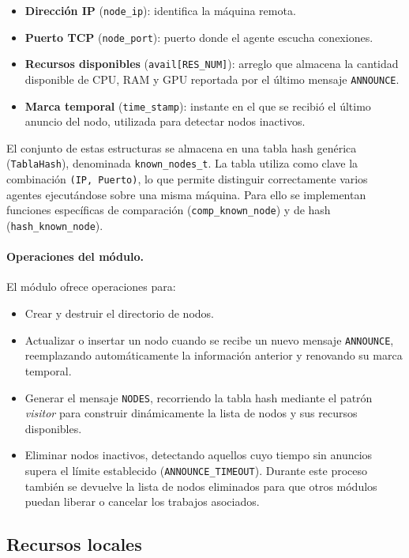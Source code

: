 \documentclass[12pt,a4paper]{article}
\begin{document}
\begin{itemize}
    \item \textbf{Dirección IP} (\texttt{node\_ip}): identifica la máquina remota.
    \item \textbf{Puerto TCP} (\texttt{node\_port}): puerto donde el agente escucha conexiones.
    \item \textbf{Recursos disponibles} (\texttt{avail[RES\_NUM]}): arreglo que almacena la cantidad disponible de CPU, RAM y GPU reportada por el último mensaje \texttt{ANNOUNCE}.
    \item \textbf{Marca temporal} (\texttt{time\_stamp}): instante en el que se recibió el último anuncio del nodo, utilizada para detectar nodos inactivos.
\end{itemize}
 
El conjunto de estas estructuras se almacena en una tabla hash genérica (\texttt{TablaHash}), denominada \texttt{known\_nodes\_t}. La tabla utiliza como clave la combinación \texttt{(IP, Puerto)}, lo que permite distinguir correctamente varios agentes ejecutándose sobre una misma máquina. Para ello se implementan funciones específicas de comparación (\texttt{comp\_known\_node}) y de hash (\texttt{hash\_known\_node}).
 
\paragraph{Operaciones del módulo.}
El módulo ofrece operaciones para:
 
\begin{itemize}
    \item Crear y destruir el directorio de nodos.
    \item Actualizar o insertar un nodo cuando se recibe un nuevo mensaje \texttt{ANNOUNCE}, reemplazando automáticamente la información anterior y renovando su marca temporal.
    \item Generar el mensaje \texttt{NODES}, recorriendo la tabla hash mediante el patrón \emph{visitor} para construir dinámicamente la lista de nodos y sus recursos disponibles.
    \item Eliminar nodos inactivos, detectando aquellos cuyo tiempo sin anuncios supera el límite establecido (\texttt{ANNOUNCE\_TIMEOUT}). Durante este proceso también se devuelve la lista de nodos eliminados para que otros módulos puedan liberar o cancelar los trabajos asociados.
\end{itemize}
 
\subsection{Recursos locales}
 
\end{document}
